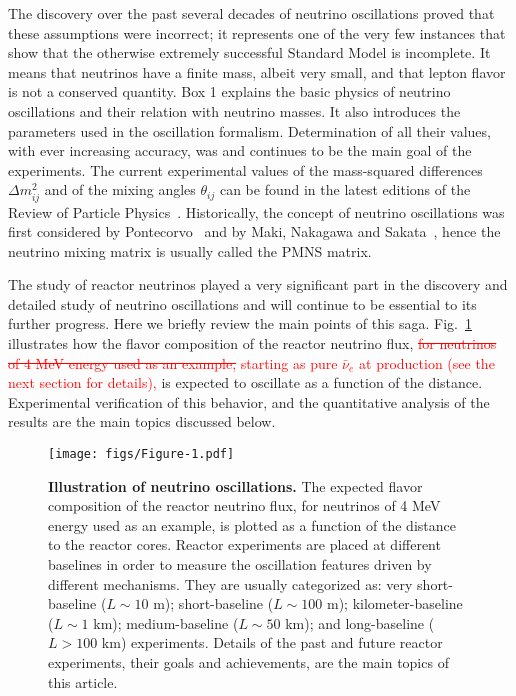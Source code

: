 \documentclass[aps,twocolumn,preprintnumbers,amsmath,superscriptaddress,amssymb,floats,nofootinbib]{revtex4-1}
\begin{document}
The discovery over the past several decades
of neutrino oscillations proved that these assumptions were incorrect; it
represents one of the very few instances that show that the otherwise
extremely successful Standard Model is incomplete. It means that
neutrinos have a finite mass, albeit very small, and that lepton flavor is not a conserved quantity.
Box 1 explains the basic physics of neutrino oscillations and their relation with neutrino masses. It
also introduces the parameters used in the oscillation formalism. Determination of all their values,
with ever increasing accuracy,
was and continues to be the main goal of the experiments.
The current experimental values of the mass-squared differences $\Delta m^2_{ij}$ and of the mixing angles $\theta_{ij}$ can be found
in the latest editions of the Review of Particle Physics~\cite{PDG14}.
Historically, the concept of neutrino oscillations was first considered by Pontecorvo~\cite{Pontecorvo57, Pontecorvo58}
and by Maki, Nakagawa and Sakata~\cite{MNS62}, hence the neutrino mixing matrix is usually called the PMNS matrix.

The study of reactor neutrinos played a very significant part in the discovery and detailed study of neutrino oscillations and will continue 
to be essential to its further progress. Here we briefly review
the main points of this saga. Fig.~\ref{fig:intro1} illustrates how the flavor composition of the reactor neutrino flux, \textcolor{red}{\st{for neutrinos of 4 MeV energy
used as an example,} starting as pure $\bar\nu_e$ at production (see the next section for details),} is expected to oscillate as a function of the distance. Experimental verification of this behavior, and the quantitative analysis of the
results are the main topics discussed below.

\begin{figure}[tb]
\begin{centering}
\texttt{[image: figs/Figure-1.pdf]}
\par\end{centering}
\caption{\label{fig:intro1} {\bf Illustration of neutrino oscillations.} The expected flavor composition of the reactor neutrino flux, for neutrinos of 4 MeV energy
used as an example, is plotted as a function of the distance to the reactor cores. Reactor experiments are placed at different baselines in order to measure the oscillation features driven by different mechanisms. They are usually categorized as: very short-baseline ($L\sim10$ m); short-baseline ($L\sim100$ m); kilometer-baseline ($L\sim1$ km); medium-baseline ($L\sim50$ km); and long-baseline ($L>100$ km) experiments. Details of the past and future reactor experiments, their goals and achievements, are the main topics of this article.
}
\end{figure}
\end{document}
